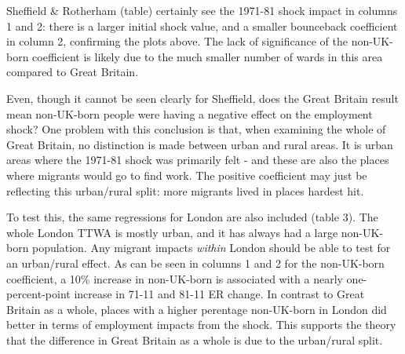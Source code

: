 \documentclass[
]{article}
\begin{document}
Sheffield \& Rotherham (table) certainly see the 1971-81 shock impact in
columns 1 and 2: there is a larger initial shock value, and a smaller
bounceback coefficient in column 2, confirming the plots above. The lack
of significance of the non-UK-born coefficient is likely due to the much
smaller number of wards in this area compared to Great Britain.

Even, though it cannot be seen clearly for Sheffield, does the Great
Britain result mean non-UK-born people were having a negative effect on
the employment shock? One problem with this conclusion is that, when
examining the whole of Great Britain, no distinction is made between
urban and rural areas. It is urban areas where the 1971-81 shock was
primarily felt - and these are also the places where migrants would go
to find work. The positive coefficient may just be reflecting this
urban/rural split: more migrants lived in places hardest hit.

To test this, the same regressions for London are also included (table
3). The whole London TTWA is mostly urban, and it has always had a large
non-UK-born population. Any migrant impacts \emph{within} London should
be able to test for an urban/rural effect. As can be seen in columns 1
and 2 for the non-UK-born coefficient, a 10\% increase in non-UK-born is
associated with a nearly one-percent-point increase in 71-11 and 81-11
ER change. In contrast to Great Britain as a whole, places with a higher
perentage non-UK-born in London did better in terms of employment
impacts from the shock. This supports the theory that the difference in
Great Britain as a whole is due to the urban/rural split.
\end{document}
